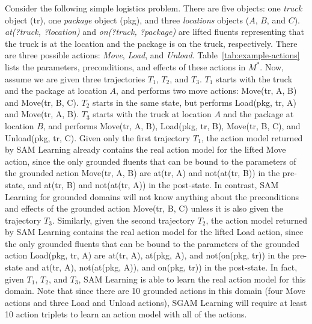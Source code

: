 \documentclass{article}
\newcommand{\realm}{\ensuremath{M^*}\xspace}
\begin{document}
Consider the following simple logistics problem. 
There are five objects: one \textit{truck} object (tr), one \textit{package} object (pkg), and three \textit{locations} objects ($A$, $B$, and $C$).
\textit{at(?truck, ?location)}  and \textit{on(?truck, ?package)} are lifted fluents representing that the truck is at the location and the package is on the truck, respectively. 
There are three possible actions: \textit{Move}, \textit{Load}, and \textit{Unload}. 
Table~\ref{tab:example-actions} lists the parameters, preconditions, and effects of these actions in \realm.
Now, assume we are given three trajectories $T_1$, $T_2$, and $T_3$. 
$T_1$ starts with the truck and the package at location $A$, 
and performs two move actions: Move(tr, A, B) and Move(tr, B, C). 
$T_2$ starts in the same state, but performs Load(pkg, tr, A) and Move(tr, A, B). 
$T_3$ starts with the truck at location $A$ and the package at location $B$, 
and performs Move(tr, A, B), Load(pkg, tr, B), Move(tr, B, C), and Unload(pkg, tr, C). 
Given only the first trajectory $T_1$, the action model returned by SAM Learning already contains the real action model for the lifted Move action, 
since the only grounded fluents that can be bound to the parameters of the grounded action Move(tr, A, B) are 
at(tr, A) and not(at(tr, B)) in the pre-state, 
and at(tr, B) and not(at(tr, A)) in the post-state. 
In contrast, SAM Learning for grounded domains will not know anything about the preconditions and effects of the grounded action Move(tr, B, C) unless it is also given the trajectory $T_3$. 
Similarly, given the second trajectory $T_2$, the action model returned by SAM Learning contains the real action model for the lifted Load action, 
since the only grounded fluents that can be bound to the parameters of the grounded action 
Load(pkg, tr, A) are 
at(tr, A), at(pkg, A), and not(on(pkg, tr)) in the pre-state
and at(tr, A), not(at(pkg, A)), and on(pkg, tr)) in the post-state. 
In fact, given $T_1$, $T_2$, and $T_3$, SAM Learning is able to learn the real action model for this domain. Note that since there are 10 grounded actions in this domain (four Move actions and three Load and Unload actions), SGAM Learning will require at least 10 action triplets to learn an action model with all of the actions. 



\end{document}
